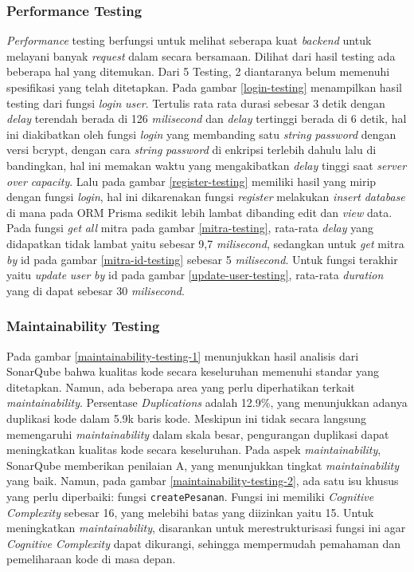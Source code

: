 \subsubsection{Performance Testing}
\textit{Performance} testing berfungsi untuk melihat seberapa kuat \textit{backend} untuk melayani banyak \textit{request} dalam secara bersamaan. Dilihat dari hasil testing ada beberapa hal yang ditemukan. Dari 5 Testing, 2 diantaranya belum memenuhi spesifikasi yang telah ditetapkan. Pada gambar \ref{login-testing} menampilkan hasil testing dari fungsi \textit{login} \textit{user}. Tertulis rata rata durasi sebesar 3 detik dengan \textit{delay} terendah berada di 126 \textit{milisecond} dan \textit{delay} tertinggi berada di 6 detik, hal ini diakibatkan oleh fungsi \textit{login} yang membanding satu \textit{string} \textit{password} dengan versi bcrypt, dengan cara \textit{string} \textit{password} di enkripsi terlebih dahulu lalu di bandingkan, hal ini memakan waktu yang mengakibatkan \textit{delay} tinggi saat \textit{server} \textit{over} \textit{capacity}. Lalu pada gambar \ref{register-testing} memiliki hasil yang mirip dengan fungsi \textit{login}, hal ini dikarenakan fungsi \textit{register} melakukan \textit{insert} \textit{database} di mana pada ORM Prisma sedikit lebih lambat dibanding edit dan \textit{view} data. Pada fungsi \textit{get} \textit{all} mitra pada gambar \ref{mitra-testing}, rata-rata \textit{delay} yang didapatkan tidak lambat yaitu sebesar 9,7 \textit{milisecond}, sedangkan untuk \textit{get} mitra \textit{by} id pada gambar \ref{mitra-id-testing} sebesar 5 \textit{milisecond}. Untuk fungsi terakhir yaitu \textit{update} \textit{user} \textit{by} id pada gambar \ref{update-user-testing}, rata-rata \textit{duration} yang di dapat sebesar 30 \textit{milisecond}.

\subsubsection{Maintainability Testing}
Pada gambar \ref{maintainability-testing-1} menunjukkan hasil analisis dari SonarQube bahwa kualitas kode secara keseluruhan memenuhi standar yang ditetapkan. Namun, ada beberapa area yang perlu diperhatikan terkait \textit{maintainability}. Persentase \textit{Duplications} adalah 12.9\%, yang menunjukkan adanya duplikasi kode dalam 5.9k baris kode. Meskipun ini tidak secara langsung memengaruhi \textit{maintainability} dalam skala besar, pengurangan duplikasi dapat meningkatkan kualitas kode secara keseluruhan. Pada aspek \textit{maintainability}, SonarQube memberikan penilaian A, yang menunjukkan tingkat \textit{maintainability} yang baik. Namun, pada gambar \ref{maintainability-testing-2}, ada satu isu khusus yang perlu diperbaiki: fungsi \texttt{createPesanan}. Fungsi ini memiliki \textit{Cognitive Complexity} sebesar 16, yang melebihi batas yang diizinkan yaitu 15. Untuk meningkatkan \textit{maintainability}, disarankan untuk merestrukturisasi fungsi ini agar \textit{Cognitive Complexity} dapat dikurangi, sehingga mempermudah pemahaman dan pemeliharaan kode di masa depan.
